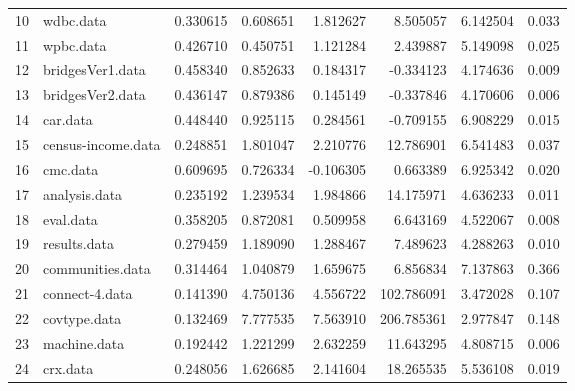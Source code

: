 \begin{table}
{\begin{tabular}{|l|l|rrrrrr|}
10 &                                wdbc.data &       0.330615 &               0.608651 &   1.812627 &    8.505057 &  6.142504 &        0.033 \\
11 &                                wpbc.data &       0.426710 &               0.450751 &   1.121284 &    2.439887 &  5.149098 &        0.025 \\
12 &                         bridgesVer1.data &       0.458340 &               0.852633 &   0.184317 &   -0.334123 &  4.174636 &        0.009 \\
13 &                         bridgesVer2.data &       0.436147 &               0.879386 &   0.145149 &   -0.337846 &  4.170606 &        0.006 \\
14 &                                 car.data &       0.448440 &               0.925115 &   0.284561 &   -0.709155 &  6.908229 &        0.015 \\
15 &                       census-income.data &       0.248851 &               1.801047 &   2.210776 &   12.786901 &  6.541483 &        0.037 \\
16 &                                 cmc.data &       0.609695 &               0.726334 &  -0.106305 &    0.663389 &  6.925342 &        0.020 \\
17 &                            analysis.data &       0.235192 &               1.239534 &   1.984866 &   14.175971 &  4.636233 &        0.011 \\
18 &                                eval.data &       0.358205 &               0.872081 &   0.509958 &    6.643169 &  4.522067 &        0.008 \\
19 &                             results.data &       0.279459 &               1.189090 &   1.288467 &    7.489623 &  4.288263 &        0.010 \\
20 &                         communities.data &       0.314464 &               1.040879 &   1.659675 &    6.856834 &  7.137863 &        0.366 \\
21 &                           connect-4.data &       0.141390 &               4.750136 &   4.556722 &  102.786091 &  3.472028 &        0.107 \\
22 &                             covtype.data &       0.132469 &               7.777535 &   7.563910 &  206.785361 &  2.977847 &        0.148 \\
23 &                             machine.data &       0.192442 &               1.221299 &   2.632259 &   11.643295 &  4.808715 &        0.006 \\
24 &                                 crx.data &       0.248056 &               1.626685 &   2.141604 &   18.265535 &  5.536108 &        0.019 \\

\end{tabular}}
\end{table}
